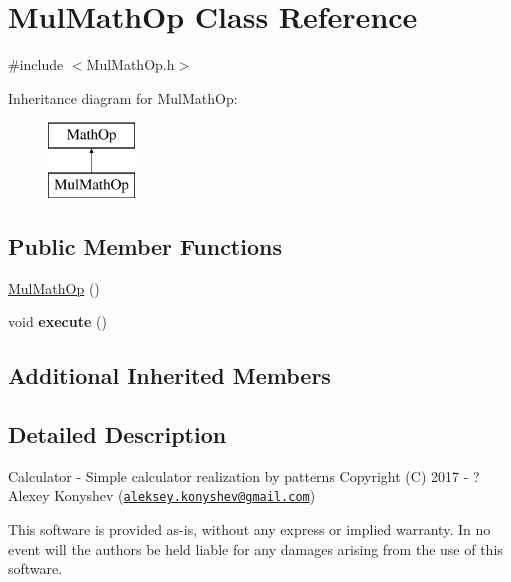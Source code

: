 \hypertarget{class_mul_math_op}{}\section{Mul\+Math\+Op Class Reference}
\label{class_mul_math_op}


{\ttfamily \#include $<$Mul\+Math\+Op.\+h$>$}

Inheritance diagram for Mul\+Math\+Op\+:\begin{figure}[H]
\begin{center}
\leavevmode
\includegraphics[height=2.000000cm]{class_mul_math_op}
\end{center}
\end{figure}
\subsection*{Public Member Functions}
\begin{DoxyCompactItemize}
\item 
\hyperlink{class_mul_math_op_a3c8af908e10b3e521af94ac6cb0a91ee}{Mul\+Math\+Op} ()
\item 
\hypertarget{class_mul_math_op_a21cfc2fe66be9eb5dc5a96d80a06bc05}{}void {\bfseries execute} ()\label{class_mul_math_op_a21cfc2fe66be9eb5dc5a96d80a06bc05}

\end{DoxyCompactItemize}
\subsection*{Additional Inherited Members}


\subsection{Detailed Description}
Calculator -\/ Simple calculator realization by patterns Copyright (C) 2017 -\/ ? Alexey Konyshev (\href{mailto:aleksey.konyshev@gmail.com}{\tt aleksey.\+konyshev@gmail.\+com})

This software is provided \textquotesingle{}as-\/is\textquotesingle{}, without any express or implied warranty. In no event will the authors be held liable for any damages arising from the use of this software.

